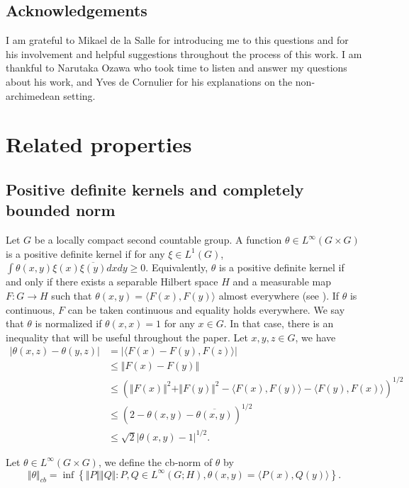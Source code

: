 \documentclass{article}
\theoremstyle{definition}
\theoremstyle{remark}
\numberwithin{equation}{section}
\begin{document}
\subsection*{Acknowledgements}
I am grateful to Mikael de la Salle for introducing me to this questions and for his involvement and helpful suggestions throughout the process of this work. I am thankful to Narutaka Ozawa who took time to listen and answer my questions about his work, and Yves de Cornulier for his explanations on the non-archimedean setting.


\section{Related properties}
\subsection{Positive definite kernels and completely bounded norm}
Let $G$ be a locally compact second countable group. A function $\theta\in L^\infty(G\times G)$ is a positive definite kernel if for any $\xi\in L^1(G)$, $\int \theta(x,y)\xi(x)\overline{\xi(y)}dxdy\geq 0$. Equivalently, $\theta$ is a positive definite kernel if and only if there exists a separable Hilbert space $H$ and a measurable map $F:G\to H$ such that $\theta(x,y)=\langle F(x),F(y)\rangle$ almost everywhere (see \cite[Appendix D]{brownc}). If $\theta$ is continuous, $F$ can be taken continuous and equality holds everywhere. We say that $\theta$ is normalized if $\theta(x,x)=1$ for any $x\in G$. In that case, there is an inequality that will be useful throughout the paper. Let $x,y,z\in G$, we have \begin{align*}
   \vert \theta(x,z)-\theta(y,z)\vert  & =  \vert\langle F(x)-F(y),F(z)\rangle\vert  \\
     & \leq  \Vert F(x)-F(y)\Vert\\
     & \leq  \left(\Vert F(x)\Vert^2+\Vert F(y)\Vert^2 - \langle F(x),F(y)\rangle- \langle F(y),F(x)\rangle\right)^{1/2}\\
     & \leq  \left( 2-\theta(x,y)-\overline{\theta(x,y)}\right)^{1/2}\\
     & \leq  \sqrt{2}\left\vert \theta(x,y)-1\right\vert^{1/2}.
\end{align*}


Let $\theta\in L^\infty(G\times G)$, we define the cb-norm of $\theta$ by $$\Vert \theta\Vert_{cb}=\inf \left\lbrace\Vert P\Vert \Vert Q\Vert : P,Q\in L^\infty(G;H), \theta(x,y)=\langle P(x),Q(y)\rangle\right\rbrace.$$
\end{document}
